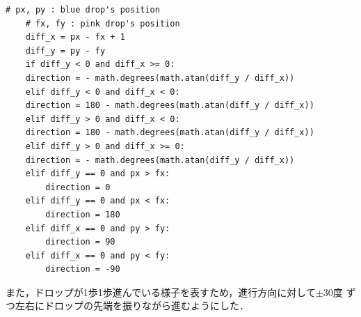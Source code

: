 \documentclass[a4]{jsarticle}
\begin{document}
\begin{lstlisting}[caption=ピンクのドロップの方向計算]
	# px, py : blue drop's position
	# fx, fy : pink drop's position
	diff_x = px - fx + 1
	diff_y = py - fy
	if diff_y < 0 and diff_x >= 0:
	direction = - math.degrees(math.atan(diff_y / diff_x))
	elif diff_y < 0 and diff_x < 0:
	direction = 180 - math.degrees(math.atan(diff_y / diff_x))
	elif diff_y > 0 and diff_x < 0:
	direction = 180 - math.degrees(math.atan(diff_y / diff_x))
	elif diff_y > 0 and diff_x >= 0:
	direction = - math.degrees(math.atan(diff_y / diff_x))
	elif diff_y == 0 and px > fx:
        direction = 0
	elif diff_y == 0 and px < fx:
        direction = 180
	elif diff_x == 0 and py > fy:
        direction = 90
	elif diff_x == 0 and py < fy:
        direction = -90
	\end{lstlisting}
また，ドロップが1歩1歩進んでいる様子を表すため，進行方向に対して$\pm 30$度
ずつ左右にドロップの先端を振りながら進むようにした．
\end{document}
